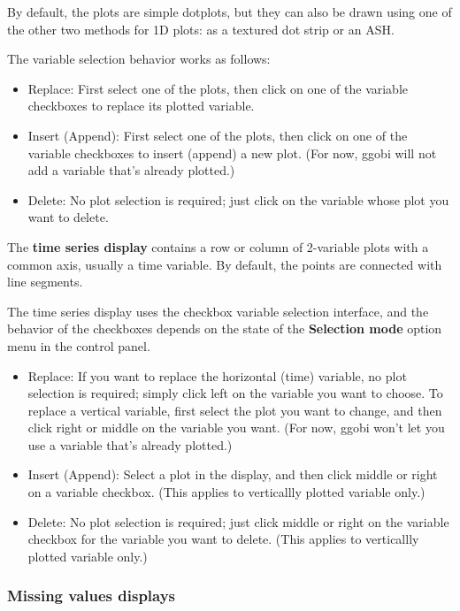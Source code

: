\documentclass[11pt]{article}
\begin{document}
By default, the plots are simple dotplots, but they can also be drawn
using one of the other two methods for 1D plots:  as a textured dot
strip or an ASH.

The variable selection behavior works as follows:

\begin{itemize}
\item Replace:  First select one of the plots, then click on one
  of the variable checkboxes to replace its plotted variable.
\item Insert (Append):  First select one of the plots, then click on
  one of the variable checkboxes to insert (append) a new plot.  (For
  now, ggobi will not add a variable that's already plotted.)
\item Delete:  No plot selection is required; just click on the
  variable whose plot you want to delete.
\end{itemize}

The {\bf time series display} contains a row or column of 2-variable
plots with a common axis, usually a time variable.  By default, the
points are connected with line segments.  

The time series display uses the checkbox variable selection interface,
and the behavior of the checkboxes depends on the state of the
{\bf Selection mode} option menu in the control panel.

\begin{itemize}
\item Replace: If you want to replace the horizontal (time) variable,
  no plot selection is required; simply click left on the variable you
  want to choose.  To replace a vertical variable, first select the
  plot you want to change, and then click right or middle on the
  variable you want.  (For now, ggobi won't let you use a variable
  that's already plotted.)
\item Insert (Append):  Select a plot in the display, and then click
  middle or right on a variable checkbox.  (This applies to
  verticallly plotted variable only.)
\item Delete: No plot selection is required; just click middle or
  right on the variable checkbox for the variable you want to
  delete.  (This applies to verticallly plotted variable only.)
\end{itemize}

\subsubsection{Missing values displays}
\label{slbl:MissingData}
\end{document}
